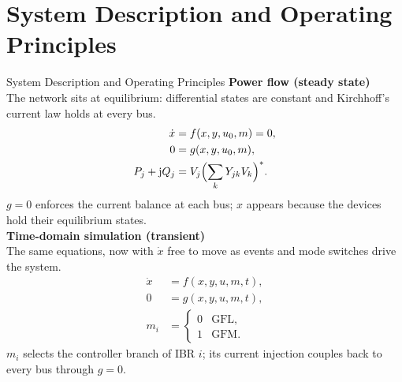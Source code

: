 \documentclass{beamer}
\begin{document}
\section{System Description and Operating Principles}
\begin{frame}{System Description and Operating Principles}
\small\textbf{Power flow (steady state)}\\[.05cm]
\footnotesize The network sits at equilibrium: differential states are constant and Kirchhoff's current law holds at every bus.
\begin{align*}
\dot x&=f(x,y,u_0,m)=0,\\
0&=g(x,y,u_0,m),\\
P_j+\mathrm jQ_j&=V_j\Bigl(\sum_kY_{jk}V_k\Bigr)^*.
\end{align*}
\vspace{-.15cm}
\footnotesize $g=0$ enforces the current balance at each bus; $x$ appears because the devices hold their equilibrium states.\\[.18cm]
\small\textbf{Time-domain simulation (transient)}\\[.05cm]
\footnotesize The same equations, now with $\dot x$ free to move as events and mode switches drive the system.
\begin{align*}
\dot x&=f(x,y,u,m,t),\\
0&=g(x,y,u,m,t),\\
m_i&=\begin{cases}0&\text{GFL},\\1&\text{GFM}.\end{cases}
\end{align*}
\vspace{-.15cm}
\footnotesize $m_i$ selects the controller branch of IBR $i$; its current injection couples back to every bus through $g=0$.
\end{frame}
\end{document}
